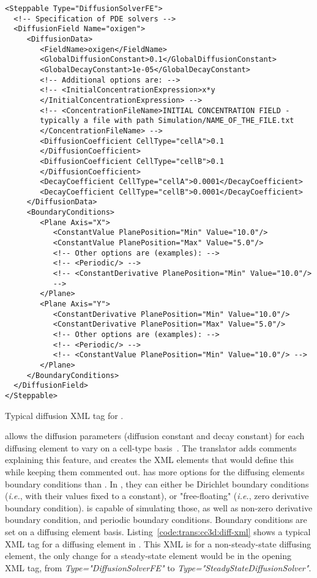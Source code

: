 \begin{listing}[H]%
\begin{verbatim}
<Steppable Type="DiffusionSolverFE">
  <!-- Specification of PDE solvers -->
  <DiffusionField Name="oxigen">
     <DiffusionData>
        <FieldName>oxigen</FieldName>
        <GlobalDiffusionConstant>0.1</GlobalDiffusionConstant>
        <GlobalDecayConstant>1e-05</GlobalDecayConstant>
        <!-- Additional options are: -->
        <!-- <InitialConcentrationExpression>x*y
        </InitialConcentrationExpression> -->
        <!-- <ConcentrationFileName>INITIAL CONCENTRATION FIELD - 
        typically a file with path Simulation/NAME_OF_THE_FILE.txt
        </ConcentrationFileName> -->
        <DiffusionCoefficient CellType="cellA">0.1
        </DiffusionCoefficient>
        <DiffusionCoefficient CellType="cellB">0.1
        </DiffusionCoefficient>
        <DecayCoefficient CellType="cellA">0.0001</DecayCoefficient>
        <DecayCoefficient CellType="cellB">0.0001</DecayCoefficient>
     </DiffusionData>
     <BoundaryConditions>
        <Plane Axis="X">
           <ConstantValue PlanePosition="Min" Value="10.0"/>
           <ConstantValue PlanePosition="Max" Value="5.0"/>
           <!-- Other options are (examples): -->
           <!-- <Periodic/> -->
           <!-- <ConstantDerivative PlanePosition="Min" Value="10.0"/> 
           -->
        </Plane>
        <Plane Axis="Y">
           <ConstantDerivative PlanePosition="Min" Value="10.0"/>
           <ConstantDerivative PlanePosition="Max" Value="5.0"/>
           <!-- Other options are (examples): -->
           <!-- <Periodic/> -->
           <!-- <ConstantValue PlanePosition="Min" Value="10.0"/> -->
        </Plane>
     </BoundaryConditions>
  </DiffusionField>
</Steppable>
\end{verbatim}
\caption{Typical diffusion XML tag for \ccd.}\label{code:trans:cc3d:diff-xml}
\end{listing}

\ccds allows the diffusion parameters (diffusion constant and decay constant) for each diffusing element to vary on a cell-type basis~\cite{swat_multi-scale_2012}. The translator adds comments explaining this feature, and creates the XML elements that would define this while keeping them commented out. \ccds has more options for the diffusing elements boundary conditions than \psc. In \psc, they can either be Dirichlet boundary conditions (\textit{i.e.}, with their values fixed to a constant), or "free-floating" (\textit{i.e.}, zero derivative boundary condition). \ccds is capable of simulating those, as well as non-zero derivative boundary condition, and periodic boundary conditions. Boundary conditions are set on a diffusing element basis. Listing~\ref{code:trans:cc3d:diff-xml} shows a typical XML tag for a diffusing element in \ccd. This XML is for a non-steady-state diffusing element, the only change for a steady-state element would be in the opening XML tag, from \textit{Type="DiffusionSolverFE"} to \textit{Type="SteadyStateDiffusionSolver"}.

